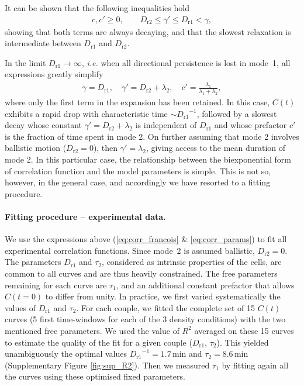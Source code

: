 \documentclass[11pt, twocolumn]{article}
\newcommand{\Dru}{{D_{\mathrm{r1}}}}
\newcommand{\Drd}{{D_{\mathrm{r2}}}}
\newcommand{\lamu}{\lambda_1}
\newcommand{\lamd}{\lambda_2}
\newcommand{\tauu}{\tau_1}
\newcommand{\taud}{\tau_2}
\newcommand{\be}{\begin{eqnarray}}
\newcommand{\ee}{\end{eqnarray}}
\newcommand{\C}{C}
\begin{document}
%
It can be shown that the following inequalities hold \be c,c'
\geqslant 0, \qquad \Drd \leqslant \gamma' \leqslant \Dru < \gamma,
\ee showing that both terms are always decaying, and that the slowest
relaxation is intermediate between $\Dru$ and $\Drd$.

In the limit $\Dru \rightarrow \infty$, {\it i.e.} when all
directional persistence is lost in mode~1, all expressions greatly
simplify \be \gamma = \Dru, \quad \gamma'=\Drd+\lamd, \quad c'=
\frac{\lamu}{\lamu + \lamd}, \ee where only the first term in the
expansion has been retained.  In this case, $\C(t)$ exhibits a rapid
drop with characteristic time $\sim \Dru^{-1}$, followed by a slowest
decay whose constant $\gamma'=\Drd+\lamd$ is independent of $\Dru$ and
whose prefactor $c'$ is the fraction of time spent in mode 2.  On
further assuming that mode 2 involves ballistic motion ($\Drd=0$),
then $\gamma'=\lamd$, giving access to the mean duration of mode 2.
In this particular case, the relationship between the biexponential
form of correlation function and the model parameters is simple.  This
is not so, however, in the general case, and accordingly we have
resorted to a fitting procedure.



\paragraph{Fitting procedure -- experimental data.}
%
We use the expressions above (\ref{eq:corr_francois} \&
\ref{eq:corr_params}) to fit all experimental correlation functions.
Since mode~2 is assumed ballistic, $\Drd=0$.  The parameters $\Dru$
and $\taud$, considered as intrinsic properties of the cells, are
common to all curves and are thus heavily constrained.  The free
parameters remaining for each curve are $\tauu$, and an additional
constant prefactor that allows $C(t=0)$ to differ from unity.
%
 In practice, we first varied systematically the values of $\Dru$
  and $\taud$.  For each couple, we fitted the complete set of 15
  $C(t)$ curves (5 first time-windows for each of the 3 density
  conditions) with the two mentioned free parameters. We used the
  value of $R^2$ averaged on these 15 curves to estimate the quality
  of the fit for a given couple ($\Dru$, $\taud$).  This yielded
  unambiguously the optimal values $\Dru^{-1}=1.7$\,min and
  $\taud=8.6$\,min (Supplementary Figure \ref{fig:sup_R2}). Then we
  measured $\tauu$ by fitting again all the curves using these
  optimised fixed parameters.  
\end{document}
